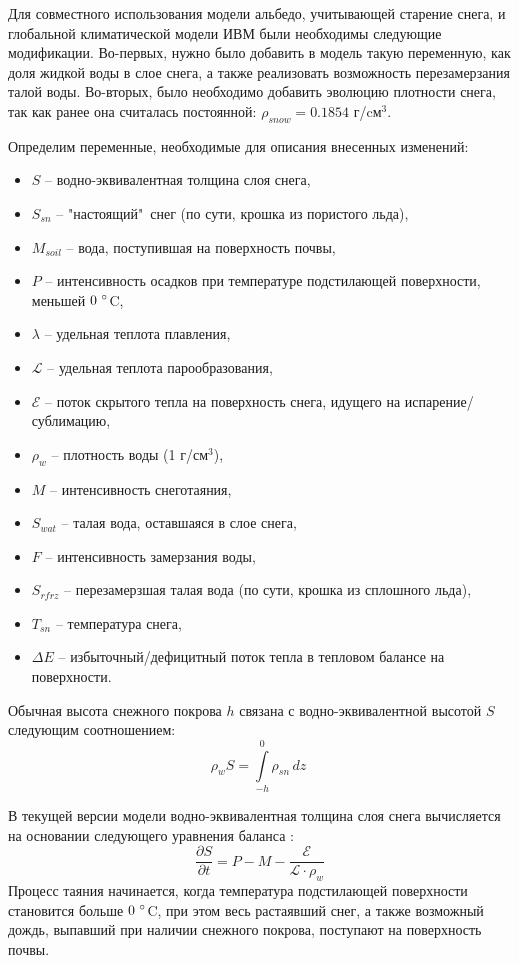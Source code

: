 \documentclass[a4paper, fontsize=14pt]{scrartcl}
\begin{document}
Для совместного использования модели альбедо, учитывающей старение снега, и глобальной климатической модели ИВМ были необходимы следующие модификации. Во-первых, нужно было добавить в модель такую переменную, как доля жидкой воды в слое снега, а также реализовать возможность перезамерзания талой воды. Во-вторых, было необходимо добавить эволюцию плотности снега, так как ранее она считалась постоянной: $\rho_{snow} = 0.1854 $ г/cм$^3$.

Определим переменные, необходимые для описания внесенных изменений: 
\begin{itemize}
    \item $S$ -- водно-эквивалентная толщина слоя снега,
    \item $S_{sn}$ -- "настоящий"\  снег (по сути, крошка из пористого льда), 
    \item $M_{soil}$ -- вода, поступившая на поверхность почвы,
    \item $P$ -- интенсивность осадков при температуре подстилающей поверхности, меньшей $0 ~\degree$C,
    \item $\lambda$ -- удельная теплота плавления, 
    \item $\mathcal{L}$ -- удельная теплота парообразования, 
    \item $\mathcal{E}$ -- поток скрытого тепла на поверхность снега, идущего на испарение/сублимацию,
    \item $\rho_w$ -- плотность воды (1 г/см$^3$),
    \item $M$ -- интенсивность снеготаяния,
    \item $S_{wat}$ -- талая вода, оставшаяся в слое снега,
    \item $F$ -- интенсивность замерзания воды,
    \item $S_{rfrz}$ -- перезамерзшая талая вода (по сути, крошка из сплошного льда),
    \item $T_{sn}$ -- температура снега, 
    \item $\Delta E$ -- избыточный/дефицитный поток тепла в тепловом балансе на поверхности.
\end{itemize}

Обычная высота снежного покрова $h$ связана с водно-эквивалентной высотой $S$ следующим соотношением:
\begin{equation}
    \rho_w S =  \int\limits_{-h}^0 \rho_{sn} \, dz\  \label{sys}
\end{equation}

В текущей версии модели водно-эквивалентная толщина слоя снега вычисляется на основании следующего уравнения баланса \cite{Volodin1998, Volodina2000}:
\begin{equation}
    \dfrac{\partial S}{\partial t} = P - M - \dfrac{\mathcal{E}}{\mathcal{L} \cdot \rho_w}  \label{sys}
\end{equation}
Процесс таяния начинается, когда температура подстилающей поверхности становится больше $0 ~\degree$C, при этом весь растаявший снег, а также возможный дождь, выпавший при наличии снежного покрова, поступают на поверхность почвы.
\end{document}
